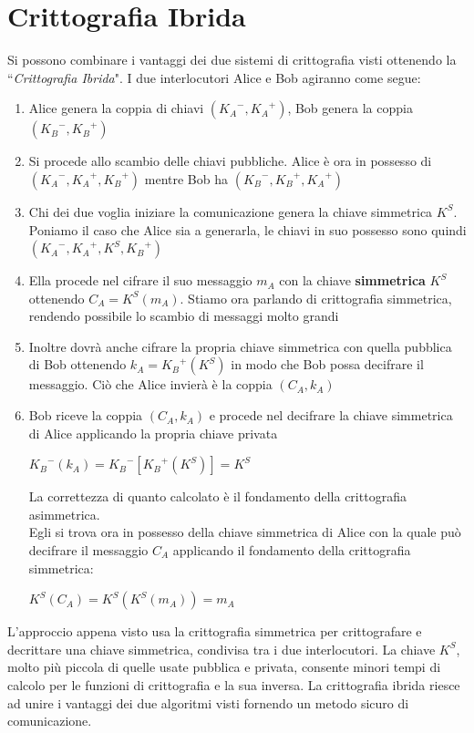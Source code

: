 \documentclass[a4paper,12pt]{tesiinfo}
\begin{document}
\section{Crittografia Ibrida}
\label{critt ibrida}
Si possono combinare i vantaggi dei due sistemi di crittografia visti ottenendo la ``\textit{Crittografia Ibrida}". I due interlocutori Alice e Bob agiranno come segue:
\begin{enumerate}
 \item Alice genera la coppia di chiavi $({K_A}^-, {K_A}^+)$, Bob genera la coppia $({K_B}^-, {K_B}^+)$
 \item Si procede allo scambio delle chiavi pubbliche. Alice \`e ora in possesso di $({K_A}^-, {K_A}^+, {K_B}^+)$ mentre Bob ha $({K_B}^-, {K_B}^+, {K_A}^+)$
 \item Chi dei due voglia iniziare la comunicazione genera la chiave simmetrica $K^S$. Poniamo il caso che Alice sia a generarla, le chiavi in suo possesso sono quindi $({K_A}^-, {K_A}^+, K^S, {K_B}^+)$
 \item Ella procede nel cifrare il suo messaggio $m_A$ con la chiave \textbf{simmetrica} $K^S$ ottenendo $C_A = K^S(m_A)$. Stiamo ora parlando di crittografia simmetrica, rendendo possibile lo scambio di messaggi molto grandi
 \item Inoltre dovr\`a anche cifrare la propria chiave simmetrica con quella pubblica di Bob ottenendo $k_A={K_B}^+(K^S)$ in modo che Bob possa decifrare il messaggio. Ci\`o che Alice invier\`a \`e la coppia $(C_A, k_A)$
 \item Bob riceve la coppia $(C_A, k_A)$ e procede nel decifrare la chiave simmetrica di Alice applicando la propria chiave privata 
 \begin{center}
  ${K_B}^-(k_A)={K_B}^-[{K_B}^+(K^S)]=K^S$
 \end{center}
 La correttezza di quanto calcolato \`e il fondamento della crittografia asimmetrica.\\
 Egli si trova ora in possesso della chiave simmetrica di Alice con la quale pu\`o decifrare il messaggio $C_A$ applicando il fondamento della crittografia simmetrica:
 \begin{center}
  ${K}^S(C_A)={K}^S({K}^S(m_A))=m_A$
 \end{center}
\end{enumerate}
L'approccio appena visto usa la crittografia simmetrica per crittografare e decrittare una chiave simmetrica, condivisa tra i due interlocutori. La chiave $K^S$, molto pi\`u piccola di quelle usate pubblica e privata, consente minori tempi di calcolo per le funzioni di crittografia e la sua inversa. La crittografia ibrida riesce ad unire i vantaggi dei due algoritmi visti fornendo un metodo sicuro di comunicazione. 
\end{document}
